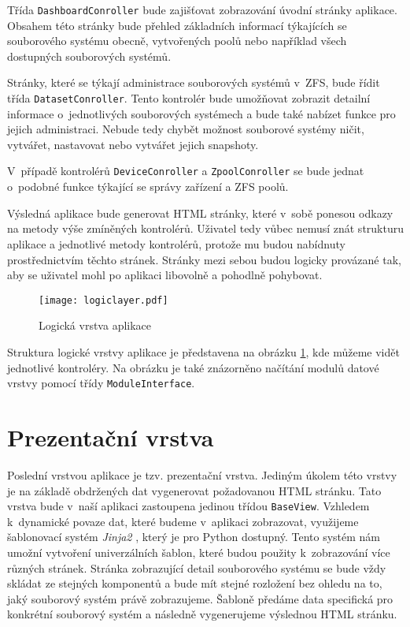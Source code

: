     Třída \verb|DashboardConroller| bude zajišťovat zobrazování úvodní stránky aplikace. Obsahem této stránky bude přehled základních informací týkajících se souborového systému obecně, vytvořených poolů nebo například všech dostupných souborových systémů.

    Stránky, které se týkají administrace souborových systémů v~ZFS, bude řídit třída \verb|DatasetConroller|. Tento kontrolér bude umožňovat zobrazit detailní informace o~jednotlivých souborových systémech a bude také nabízet funkce pro jejich administraci. Nebude tedy chybět možnost souborové systémy ničit, vytvářet, nastavovat nebo vytvářet jejich snapshoty.

    V~případě kontrolérů \verb|DeviceConroller| a \verb|ZpoolConroller| se bude jednat o~podobné funkce týkající se správy zařízení a ZFS poolů.

    Výsledná aplikace bude generovat HTML stránky, které v~sobě ponesou odkazy na metody výše zmíněných kontrolérů. Uživatel tedy vůbec nemusí znát strukturu aplikace a jednotlivé metody kontrolérů, protože mu budou nabídnuty prostřednictvím těchto stránek. Stránky mezi sebou budou logicky provázané tak, aby se uživatel mohl po aplikaci libovolně a pohodlně pohybovat.
    
    \begin{figure}
        \centering
        \texttt{[image: logiclayer.pdf]}
        \caption{Logická vrstva aplikace}
        \label{logiclayer}
    \end{figure}
    
    Struktura logické vrstvy aplikace je představena na obrázku \ref{logiclayer}, kde můžeme vidět jednotlivé kontroléry. Na obrázku je také znázorněno načítání modulů datové vrstvy pomocí třídy \verb|ModuleInterface|.

\section{Prezentační vrstva}
Poslední vrstvou aplikace je tzv. prezentační vrstva. Jediným úkolem této vrstvy je na základě obdržených dat vygenerovat požadovanou HTML stránku. Tato vrstva bude v~naší aplikaci zastoupena jedinou třídou \verb|BaseView|. Vzhledem k~dynamické povaze dat, které budeme v~aplikaci zobrazovat, využijeme šablonovací systém \emph{Jinja2} \cite{jinja2}, který je pro Python dostupný. Tento systém nám umožní vytvoření univerzálních šablon, které budou použity k~zobrazování více různých stránek. Stránka zobrazující detail souborového systému se bude vždy skládat ze stejných komponentů a bude mít stejné rozložení bez ohledu na to, jaký souborový systém právě zobrazujeme. Šabloně předáme data specifická pro konkrétní souborový systém a následně vygenerujeme výslednou HTML stránku.
